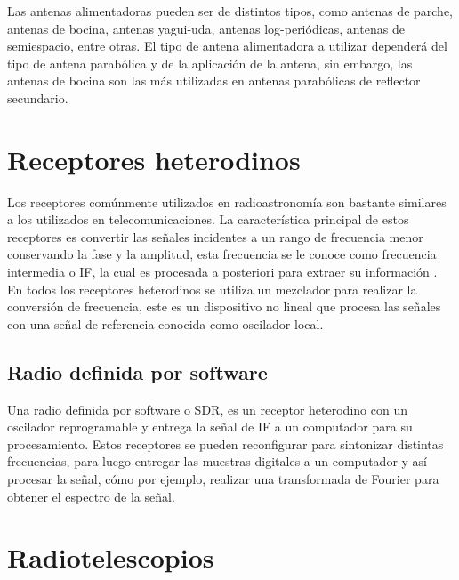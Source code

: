 Las antenas alimentadoras pueden ser de distintos tipos, como antenas de parche, antenas de bocina, antenas yagui-uda, antenas log-periódicas, antenas de semiespacio, entre otras. El tipo de antena alimentadora a utilizar dependerá del tipo de antena parabólica y de la aplicación de la antena, sin embargo, las antenas de bocina son las más utilizadas en antenas parabólicas de reflector secundario.\\


\section{Receptores heterodinos}

Los receptores comúnmente utilizados en radioastronomía son bastante similares a los utilizados en telecomunicaciones. La característica principal de estos receptores es convertir las señales incidentes a un rango de frecuencia menor conservando la fase y la amplitud, esta frecuencia se le conoce como frecuencia intermedia o IF, la cual es procesada a posteriori para extraer su información \cite{Finger2013}.\\

En todos los receptores heterodinos se utiliza un mezclador para realizar la conversión de frecuencia, este es un dispositivo no lineal que procesa las señales con una señal de referencia conocida como oscilador local.\\


\subsection{Radio definida por software}

Una radio definida por software o SDR, es un receptor heterodino con un oscilador reprogramable y entrega la señal de IF a un computador para su procesamiento. Estos receptores se pueden reconfigurar para sintonizar distintas frecuencias, para luego entregar las muestras digitales a un computador y así procesar la señal, cómo por ejemplo, realizar una transformada de Fourier para obtener el espectro de la señal.\\





\section{Radiotelescopios}

